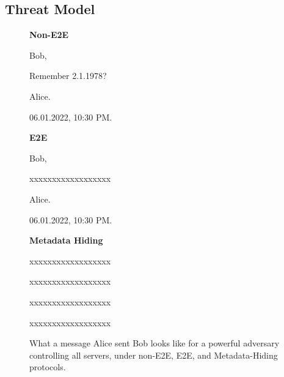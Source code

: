 \subsection{Threat Model}
\begin{figure}
\begin{minipage}[t]{0.3333\textwidth}
\textbf{Non-E2E}
\begin{framed}
Bob,

Remember 2.1.1978?

Alice. 

06.01.2022, 10:30 PM.
\end{framed}
\end{minipage}%
\begin{minipage}[t]{0.3333\textwidth}
\textbf{E2E}
\begin{framed}
Bob,

xxxxxxxxxxxxxxxxxx

Alice. 

06.01.2022, 10:30 PM.
\end{framed}
\end{minipage}%
\begin{minipage}[t]{0.3333\textwidth}
\textbf{Metadata Hiding}
\begin{framed}
xxxxxxxxxxxxxxxxxx

xxxxxxxxxxxxxxxxxx

xxxxxxxxxxxxxxxxxx

xxxxxxxxxxxxxxxxxx
\end{framed}
\end{minipage}
\caption{What a message Alice sent Bob looks like for a powerful adversary controlling all servers, under non-E2E, E2E, and Metadata-Hiding protocols.}
\end{figure}


